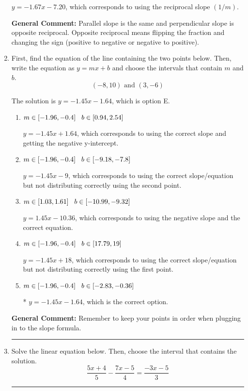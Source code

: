 \documentclass{extbook}[14pt]
\newcommand{\litem}[1]{\item #1

\rule{\textwidth}{0.4pt}}
\begin{document}
\begin{enumerate}
{\begin{enumerate}[label=\Alph*.]
 $y = -1.67x - 7.20$, which corresponds to using the reciprocal slope $(1/m)$.
\end{enumerate}

\textbf{General Comment:} Parallel slope is the same and perpendicular slope is opposite reciprocal. Opposite reciprocal means flipping the fraction and changing the sign (positive to negative or negative to positive).
}
\litem{
First, find the equation of the line containing the two points below. Then, write the equation as $ y=mx+b $ and choose the intervals that contain $m$ and $b$.
\[ (-8, 10) \text{ and } (3, -6) \]

The solution is \( y = -1.45x -1.64 \), which is option E.\begin{enumerate}[label=\Alph*.]
\item \( m \in [-1.96, -0.4] \hspace*{3mm} b \in [0.94, 2.54] \)

 $y = -1.45x + 1.64$, which corresponds to using the correct slope and getting the negative y-intercept.
\item \( m \in [-1.96, -0.4] \hspace*{3mm} b \in [-9.18, -7.8] \)

 $y = -1.45x -9$, which corresponds to using the correct slope/equation but not distributing correctly using the second point.
\item \( m \in [1.03, 1.61] \hspace*{3mm} b \in [-10.99, -9.32] \)

 $y = 1.45x -10.36$, which corresponds to using the negative slope and the correct equation.
\item \( m \in [-1.96, -0.4] \hspace*{3mm} b \in [17.79, 19] \)

 $y = -1.45x + 18$, which corresponds to using the correct slope/equation but not distributing correctly using the first point.
\item \( m \in [-1.96, -0.4] \hspace*{3mm} b \in [-2.83, -0.36] \)

* $y = -1.45x -1.64$, which is the correct option.
\end{enumerate}

\textbf{General Comment:} Remember to keep your points in order when plugging in to the slope formula.
}
\litem{
Solve the linear equation below. Then, choose the interval that contains the solution.
\[ \frac{5x + 4}{5} - \frac{7x -5}{4} = \frac{-3x -5}{3} \]

}
\end{enumerate}
\end{document}
